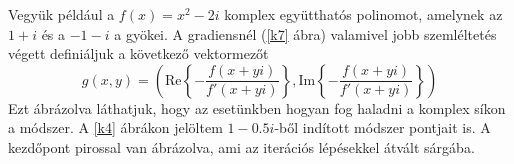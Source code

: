 \documentclass[a4paper,12pt]{report}
\begin{document}
            Vegyük például a $f(x)=x^2-2i$ komplex együtthatós polinomot, amelynek az $1+i$ és a $-1-i$ a gyökei. A gradiensnél (\ref{k7} ábra) valamivel jobb szemléltetés végett definiáljuk a következő vektormezőt
			\[g(x,y)=\left(\mathrm{Re} \left\{ -\frac{f(x+yi)}{f'(x+yi)} \right \} ,\mathrm{Im} \left\{-\frac{f(x+yi)}{f'(x+yi)}\right \} \right)\]
            Ezt ábrázolva láthatjuk, hogy az esetünkben hogyan fog haladni a komplex síkon a módszer. A \ref{k4} ábrákon jelöltem $1-0.5i$-ből indított módszer pontjait is. A kezdőpont pirossal van ábrázolva, ami az iterációs lépésekkel átvált sárgába.
			\begin{figure}[htp!]
                \hfill

\end{figure}
\end{document}

